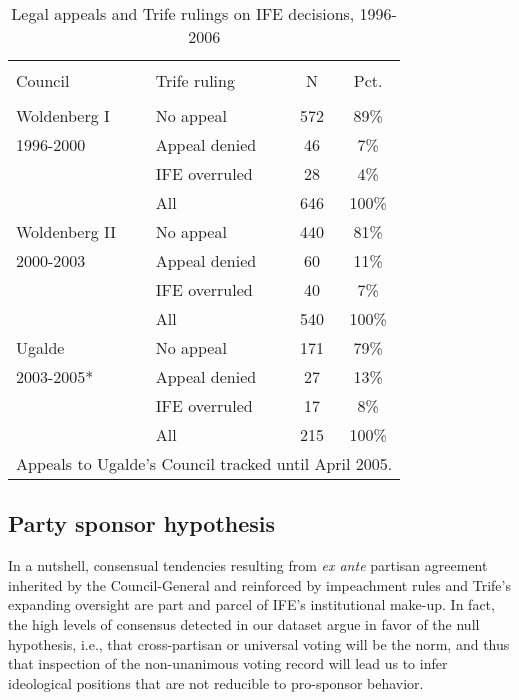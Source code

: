 \documentclass[12 pt, letter]{article}
\begin{document}
\begin{table}
\caption{Legal appeals and {\sc Trife} rulings on IFE decisions, 1996-2006}\label{T:rulings}
\begin{center}
\begin{tabular}{llcc}
\hline\\ [-1.5ex]
Council & {\sc Trife} ruling &  N  & Pct. \\
\hline \\ [-1ex]
Woldenberg I & No appeal  & 572 &  89\% \\
1996-2000 & Appeal denied &  46 &   7\% \\
          & IFE overruled &  28 &   4\% \\
          & All           & 646 & 100\% \\ [1.2ex]
Woldenberg II & No appeal & 440 &  81\% \\
2000-2003 & Appeal denied &  60 &  11\% \\
          & IFE overruled &  40 &   7\% \\
          & All           & 540 & 100\% \\ [1.2ex]
Ugalde    & No appeal     & 171 &  79\% \\
2003-2005* & Appeal denied &  27 &  13\% \\
          & IFE overruled &  17 &   8\% \\
          & All           & 215 & 100\% \\
\hline \multicolumn{4}{l}{\small * Appeals to Ugalde's Council
tracked until April 2005.}
\end{tabular}
\end{center}
\end{table}


\subsection{Party sponsor hypothesis}
In a nutshell, consensual tendencies resulting from \emph{ex ante} partisan agreement inherited by the Council-General and reinforced by impeachment rules and {\sc Trife}'s expanding oversight are part and parcel of IFE's institutional make-up.  In fact, the high levels of consensus detected in our dataset argue in favor of the null hypothesis, i.e., that cross-partisan or universal voting will be the norm, and thus that inspection of the non-unanimous voting record will lead us to infer ideological positions that are not reducible to pro-sponsor behavior.
\end{document}
